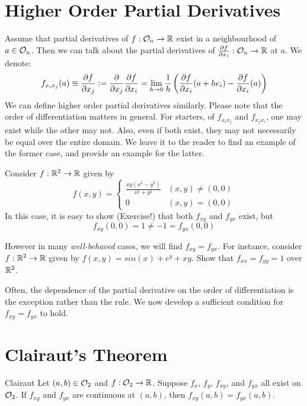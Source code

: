 \documentclass[../Analysis-3.tex]{subfiles}
\begin{document}
\section{Higher Order Partial Derivatives}

Assume that partial derivatives of $f: \mathcal{O}_{n} \to \mathbb{R}$ exist in a neighbourhood of $a \in \mathcal{O}_{n} $. Then we can talk about the partial derivatives of $\pdv{f}{x_i}: \mathcal{O}_{n} \to \mathbb{R}$ at $a$. We denote:
\[f_{x_i x_j}(a) \equiv \pdv{f}{x_j} \mathrel{\mathop:}= \frac{\partial}{\partial x_j} \pdv{f}{x_i} = \lim_{h \to 0} \frac{1}{h} \left( \pdv{f}{x_i}\/(a+h e_i)- \pdv{f}{x_i}\/ (a) \right)
\]
We can define higher order partial derivatives similarly. Please note that the order of differentiation matters in general. For starters, of  $f_{x_i x_j}$ and $f_{x_j x_i}$, one may exist while the other may not. Also, even if both exist, they may not necessarily be equal over the entire domain. We leave it to the reader to find an example of the former case, and provide an example for the latter.

\begin{Eg}{}{}
  Consider $f: \mathbb{R}^2 \to \mathbb{R}$ given by
  \[
    f(x,y) =
    \begin{cases}
      \frac{xy(x^2 - y^2)}{x^2 + y^2} & (x,y) \neq (0,0) \\
      0                               & (x,y) = (0,0)
    \end{cases}
  \]
  In this case, it is easy to show (Exercise!) that both $f_{xy}$ and $f_{yx}$ exist, but
  \[f_{xy}(0,0) = 1 \neq -1 = f_{yx}(0,0)\]
\end{Eg}

\begin{Eg}{}{}
  However in many \emph{well-behaved} cases, we will find $f_{xy} = f_{yx}$.
  For instance, consider $f: \mathbb{R}^2 \to \mathbb{R}$ given by $f(x,y) = sin(x) + e^y + xy$. Show that $f_{xx} = f_{yy} = 1$ over $\mathbb{R}^2$.
\end{Eg}

Often, the dependence of the partial derivative on the order of differentiation is the exception rather than the rule. We now develop a sufficient condition for $f_{xy} = f_{yx}$ to hold.

\section{Clairaut's Theorem}

\begin{Thm}{Clairaut}{}\label{thm1:19}
  Let $(a,b) \in \mathcal{O}_{2}$ and $f:\mathcal{O}_{2} \to \mathbb{R}$. Suppose $f_x$, $f_y$, $f_{xy}$, and $f_{yx}$ all exist on $\mathcal{O}_{2}$. If $f_{xy}$ and $f_{yx}$ are continuous at $(a,b)$, then $f_{xy}(a,b) = f_{yx}(a,b)$.
\end{Thm}
\end{document}
